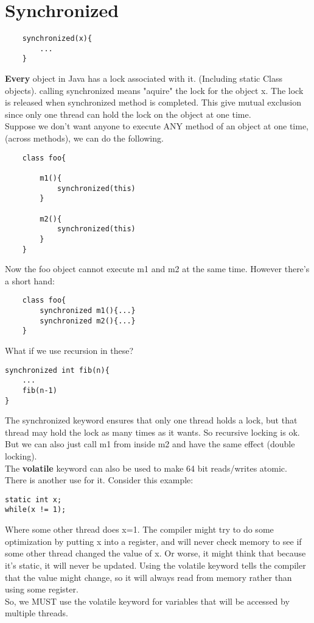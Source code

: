 \documentclass[12pt]{article}
\theoremstyle{definition}
\begin{document}
\section{Synchronized}
\begin{lstlisting}
	synchronized(x){
		...
	}
\end{lstlisting}
\textbf{Every} object in Java has a lock associated with it. (Including static Class objects). calling synchronized means "aquire" the lock for the object x. The lock is released when synchronized method is completed. This give mutual exclusion since only one thread can hold the lock on the object at one time.
\\ \linebreak
Suppose we don't want anyone to execute ANY method of an object at one time, (across methods), we can do the following.
\begin{lstlisting}
	class foo{
		
		m1(){
			synchronized(this)
		}
		
		m2(){
			synchronized(this)
		}
	}
\end{lstlisting}
Now the foo object cannot execute m1 and m2 at the same time. However there's a short hand:
\begin{lstlisting}
	class foo{
		synchronized m1(){...}
		synchronized m2(){...}
	}
\end{lstlisting}

What if we use recursion in these?
\begin{lstlisting}
synchronized int fib(n){
	...
	fib(n-1)
}
\end{lstlisting}
The synchronized keyword ensures that only one thread holds a lock, but that thread may hold the lock as many times as it wants. So recursive locking is ok. But we can also just call m1 from inside m2 and have the same effect (double locking). 
\\ \linebreak
The \textbf{volatile} keyword can also be used to make 64 bit reads/writes atomic. There is another use for it. Consider this example:
\begin{lstlisting}
static int x;
while(x != 1);
\end{lstlisting}
Where some other thread does x=1. The compiler might try to do some optimization by putting x into a register, and will never check memory to see if some other thread changed the value of x. Or worse, it might think that because it's static, it will never be updated. Using the volatile keyword tells the compiler that the value might change, so it will always read from memory rather than using some register. 
\\ \linebreak
So, we MUST use the volatile keyword for variables that will be accessed by multiple threads.
\end{document}
